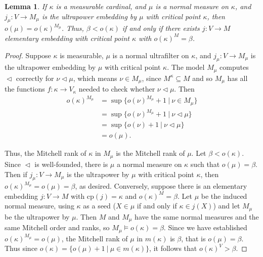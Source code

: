 \documentclass[10pt,leqno]{amsart}
\newtheorem{lemma}[theorem]{Lemma}
\begin{document}
\begin{lemma} If $\kappa$ is a measurable cardinal, and $\mu$ is a normal measure on $\kappa$, and $j_{\mu} : V \to M_{\mu}$ is the ultrapower embedding by $\mu$ with critical point $\kappa$, then $o(\mu) = o(\kappa)^{M_{\mu}}$. Thus, $\beta < o(\kappa)$ if and only if there exists $j : V \to M$ elementary embedding with critical point $\kappa$ with $o(\kappa)^M = \beta$.
\end{lemma}

\begin{proof} Suppose $\kappa$ is measurable, $\mu$ is a normal ultrafilter on $\kappa$, and $j_{\mu} : V \to M_{\mu}$ is the ultrapower embedding by $\mu$ with critical point $\kappa$. The model $M_{\mu}$ computes $\vartriangleleft$ correctly for $\nu \vartriangleleft \mu$, which means $\nu \in M_{\mu}$, since $M^{\kappa} \subseteq M$ and so $M_{\mu}$ has all the functions $f: \kappa \to V_{\kappa}$ needed to check whether $\nu \vartriangleleft \mu$. Then
\begin{equation}
\begin{split}
o(\kappa)^{M_{\mu}} & = \sup\{o(\nu)^{M_{\mu}} + 1 \ | \ \nu \in M_{\mu} \} \\
 & = \sup\{o(\nu)^{M_{\mu}}+1 \ | \ \nu \vartriangleleft \mu\}\\
 & = \sup\{o(\nu) + 1 \ | \ \nu \vartriangleleft \mu\} \\
 & = o(\mu).
\end{split}
\end{equation}

Thus, the Mitchell rank of $\kappa$ in $M_{\mu}$ is the Mitchell rank of $\mu$. Let $\beta < o(\kappa)$. Since $\vartriangleleft$ is well-founded, there is $\mu$ a normal measure on $\kappa$ such that $o(\mu) = \beta$. Then if $j_{\mu} : V \to M_{\mu}$ is the ultrapower by $\mu$ with critical point $\kappa$, then $o(\kappa)^{M_{\mu}} = o(\mu) = \beta$, as desired. Conversely, suppose there is an elementary embedding $j: V \to M$ with cp$(j) = \kappa$ and $o(\kappa)^M = \beta$. Let $\mu$ be the induced normal measure, using $\kappa$ as a seed ($X \in \mu$ if and only if $\kappa \in j(X)$) and let $M_{\mu}$ be the ultrapower by $\mu$. Then $M$ and $M_{\mu}$ have the same normal measures and the same Mitchell order and ranks, so $M_{\mu} \models o(\kappa) = \beta$. Since we have established $o(\kappa)^{M_{\mu}} = o(\mu)$, the Mitchell rank of $\mu$ in $m(\kappa)$ is $\beta$, that is $o(\mu) = \beta$. Thus since $o(\kappa) = \{ o(\mu) + 1 \ | \ \mu \in m(\kappa)\}$, it follows that $o(\kappa)^V > \beta$.
\end{proof}
\end{document}
